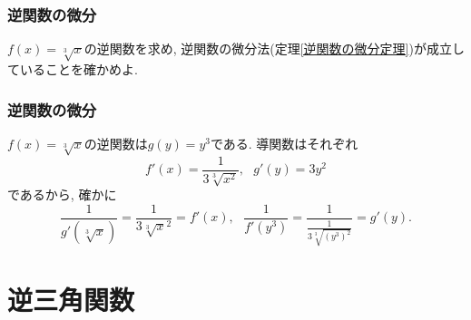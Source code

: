 \begin{frame}
\frametitle{逆関数の微分}

\begin{Prob}
$f(x)=\sqrt[3]{x}$の逆関数を求め, 逆関数の微分法(定理\ref{逆関数の微分定理})が成立していることを確かめよ. 
\end{Prob}

\end{frame}





\begin{frame}
\frametitle{逆関数の微分}


$f(x)=\sqrt[3]{x}$の逆関数は$g(y)=y^3$である. 導関数はそれぞれ
$$
f'(x)=\frac{1}{3 \sqrt[3]{x^2}}, \ \ \ g'(y)=3y^2
$$
であるから, 確かに
$$
\frac{1}{g'(\sqrt[3]{x})}=\frac{1}{3\sqrt[3]{x}^2}=f'(x), \ \ \ 
\frac{1}{f'(y^3)}=\frac{1}{\frac{1}{3 \sqrt[3]{(y^3)^2}}}=g'(y). 
$$

\end{frame}





%
%
%




\section{逆三角関数}

